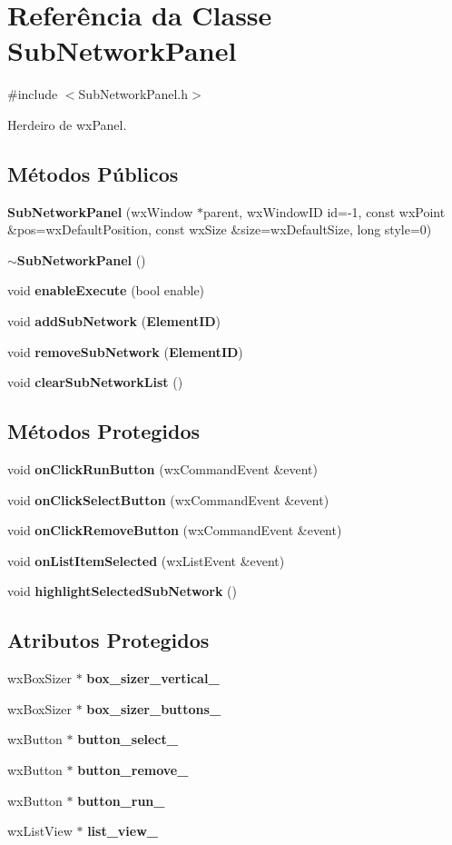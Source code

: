 \section{Referência da Classe Sub\+Network\+Panel}
\label{class_sub_network_panel}


{\ttfamily \#include $<$Sub\+Network\+Panel.\+h$>$}



Herdeiro de wx\+Panel.

\subsection*{Métodos Públicos}
\begin{DoxyCompactItemize}
\item 
{\bf Sub\+Network\+Panel} (wx\+Window $\ast$parent, wx\+Window\+ID id=-\/1, const wx\+Point \&pos=wx\+Default\+Position, const wx\+Size \&size=wx\+Default\+Size, long style=0)
\item 
{\bf $\sim$\+Sub\+Network\+Panel} ()
\item 
void {\bf enable\+Execute} (bool enable)
\item 
void {\bf add\+Sub\+Network} ({\bf Element\+ID})
\item 
void {\bf remove\+Sub\+Network} ({\bf Element\+ID})
\item 
void {\bf clear\+Sub\+Network\+List} ()
\end{DoxyCompactItemize}
\subsection*{Métodos Protegidos}
\begin{DoxyCompactItemize}
\item 
void {\bf on\+Click\+Run\+Button} (wx\+Command\+Event \&event)
\item 
void {\bf on\+Click\+Select\+Button} (wx\+Command\+Event \&event)
\item 
void {\bf on\+Click\+Remove\+Button} (wx\+Command\+Event \&event)
\item 
void {\bf on\+List\+Item\+Selected} (wx\+List\+Event \&event)
\item 
void {\bf highlight\+Selected\+Sub\+Network} ()
\end{DoxyCompactItemize}
\subsection*{Atributos Protegidos}
\begin{DoxyCompactItemize}
\item 
wx\+Box\+Sizer $\ast$ {\bf box\+\_\+sizer\+\_\+vertical\+\_\+}
\item 
wx\+Box\+Sizer $\ast$ {\bf box\+\_\+sizer\+\_\+buttons\+\_\+}
\item 
wx\+Button $\ast$ {\bf button\+\_\+select\+\_\+}
\item 
wx\+Button $\ast$ {\bf button\+\_\+remove\+\_\+}
\item 
wx\+Button $\ast$ {\bf button\+\_\+run\+\_\+}
\item 
wx\+List\+View $\ast$ {\bf list\+\_\+view\+\_\+}
\end{DoxyCompactItemize}


